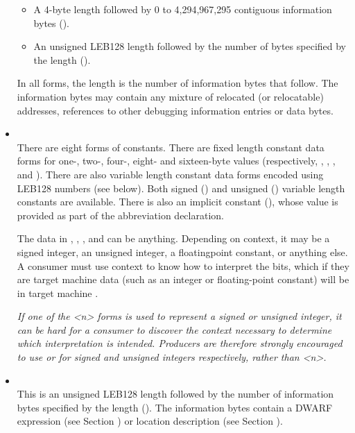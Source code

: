 \begin{itemize}
\begin{itemize}
\item
A 4-byte length followed by 0 to 4,294,967,295 contiguous
information bytes (\DWFORMblockfourTARG).

\item
An unsigned LEB128
length followed by the number of bytes
specified by the length (\DWFORMblockTARG).
\end{itemize}

In all forms, the length is the number of information bytes
that follow. The information bytes may contain any mixture
of relocated (or relocatable) addresses, references to other
debugging information entries or data bytes.

\item {} \\
There are eight forms of constants. There are fixed length
constant data forms for one-, two-, four-, eight- and sixteen-byte values
(respectively, 
\DWFORMdataoneTARG, 
\DWFORMdatatwoTARG, 
\DWFORMdatafourTARG,
\DWFORMdataeightTARG{} and
\DWFORMdatasixteenTARG). 
There are also variable length constant
data forms encoded using LEB128 numbers (see below). 
Both signed (\DWFORMsdataTARG) and unsigned 
(\DWFORMudataTARG) variable length constants are available.
There is also an implicit constant (\DWFORMimplicitconst),
whose value is provided as part of the abbreviation
declaration.

The data in \DWFORMdataone, 
\DWFORMdatatwo, 
\DWFORMdatafour{}, 
\DWFORMdataeight{} and
\DWFORMdatasixteen{} 
can be anything. Depending on context, it may
be a signed integer, an unsigned integer, a floating\dash point
constant, or anything else. A consumer must use context to
know how to interpret the bits, which if they are target
machine data (such as an integer or floating-point constant)
will be in target machine \byteorder.

\textit{If one of the \DWFORMdataTARG\textless n\textgreater 
forms is used to represent a
signed or unsigned integer, it can be hard for a consumer
to discover the context necessary to determine which
interpretation is intended. Producers are therefore strongly
encouraged to use \DWFORMsdata{} or 
\DWFORMudata{} for signed and
unsigned integers respectively, rather than 
\DWFORMdata\textless n\textgreater.}

\item {} \\
This is an unsigned LEB128 length followed by the
number of information bytes specified by the length
(\DWFORMexprlocTARG). 
The information bytes contain a DWARF expression 
(see Section ) 
or location description 
(see Section ).


\end{itemize}
